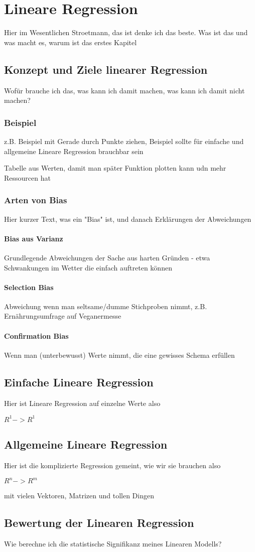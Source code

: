 \section{Lineare Regression}
\label{sec:LineareRegression}
Hier im Wesentlichen Stroetmann, das ist denke ich das beste. 
Was ist das und was macht es, warum ist das erstes Kapitel
\subsection{Konzept und Ziele linearer Regression}
Wofür brauche ich das, was kann ich damit machen, was kann ich damit nicht machen?
\subsubsection{Beispiel}
z.B. Beispiel mit Gerade durch Punkte ziehen, Beispiel sollte für einfache und allgemeine Lineare Regression brauchbar sein 

Tabelle aus Werten, damit man später Funktion plotten kann udn mehr Ressourcen hat 
\subsubsection{Arten von Bias}
Hier kurzer Text, was ein "Bias" ist, und danach Erklärungen der Abweichungen \cite{BiasTypes}
\paragraph{Bias aus Varianz} Grundlegende Abweichungen der Sache aus harten Gründen - etwa Schwankungen im Wetter die einfach auftreten können

\paragraph{Selection Bias} Abweichung wenn man seltsame/dumme Stichproben nimmt, z.B. Ernährungsumfrage auf Veganermesse

\paragraph{Confirmation Bias} Wenn man (unterbewusst) Werte nimmt, die eine gewisses Schema erfüllen 
\subsection{Einfache Lineare Regression}
Hier ist Lineare Regression auf einzelne Werte also 

$R^1 -> R^1$

\subsection{Allgemeine Lineare Regression}
Hier ist die komplizierte Regression gemeint, wie wir sie brauchen also

$R^n -> R^m$

mit vielen Vektoren, Matrizen und tollen Dingen

\subsection{Bewertung der Linearen Regression}
Wie berechne ich die statistische Signifikanz meines Linearen Modells?